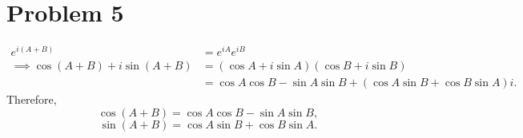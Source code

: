 \documentclass[11pt, letterpaper]{article}
\begin{document}
\section*{Problem 5}
\begin{align*}
	e^{i(A+B)} &=e^{iA} e^{iB} \\
	\implies \cos (A+B)+i \sin (A+B)&=\left( \cos A+i \sin A \right) \left( \cos B + i \sin B \right) \\
					&=\cos A \cos B- \sin A \sin B+\left( \cos A \sin B+\cos B \sin A \right) i
.\end{align*}
Therefore,
\[
	\cos (A+B)=\cos A \cos B-\sin A \sin B,
\]
\[
	\sin (A+B)=\cos A \sin B+\cos B \sin A
.\]
\end{document}
